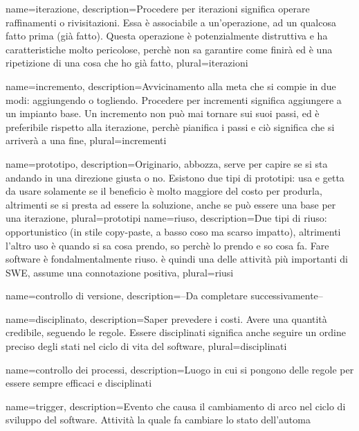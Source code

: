 {
name=iterazione,
description={Procedere per iterazioni significa operare raffinamenti o rivisitazioni. Essa \`e associabile a un'operazione, ad un qualcosa fatto prima (gi\`a fatto). Questa operazione \`e potenzialmente distruttiva e ha caratteristiche molto pericolose, perch\`e non sa garantire come finir\`a ed \`e una ripetizione di una cosa che ho gi\`a fatto},
plural=iterazioni
}

{
name=incremento,
description={Avvicinamento alla meta che si compie in due modi: aggiungendo o togliendo. Procedere per incrementi significa aggiungere a un impianto base. Un incremento non pu\`o mai tornare sui suoi passi, ed \`e preferibile rispetto alla iterazione, perch\`e pianifica i passi e ci\`o significa che si arriver\`a a una fine},
plural=incrementi
}

{
name=prototipo,
description={Originario, abbozza, serve per capire se si sta andando in una direzione giusta o no. Esistono due tipi di prototipi: usa e getta da usare solamente se il beneficio \`e molto maggiore del costo per produrla, altrimenti se si presta ad essere la soluzione, anche se pu\`o essere una base per una iterazione},
plural=prototipi
}
{
name=riuso,
description={Due tipi di riuso: opportunistico (in stile copy-paste, a basso coso ma scarso impatto), altrimenti l'altro uso \`e quando si sa cosa prendo, so perch\`e lo prendo e so cosa fa. Fare software \`e fondalmentalmente riuso. \`e quindi una delle attivit\`a pi\`u importanti di SWE, assume una connotazione positiva},
plural=riusi
}

{
name=controllo di versione,
description={--Da completare successivamente--}
}

{
name=disciplinato,
description={Saper prevedere i costi. Avere una quantit\`a credibile, seguendo le regole. Essere disciplinati significa anche seguire un ordine preciso degli stati nel ciclo di vita del software},
plural=disciplinati
}

{
name=controllo dei processi,
description={Luogo in cui si pongono delle regole per essere sempre efficaci e disciplinati}
}

{
name=trigger,
description={Evento che causa il cambiamento di arco nel ciclo di sviluppo del software. Attivit\`a la quale fa cambiare lo stato dell'automa}
}

